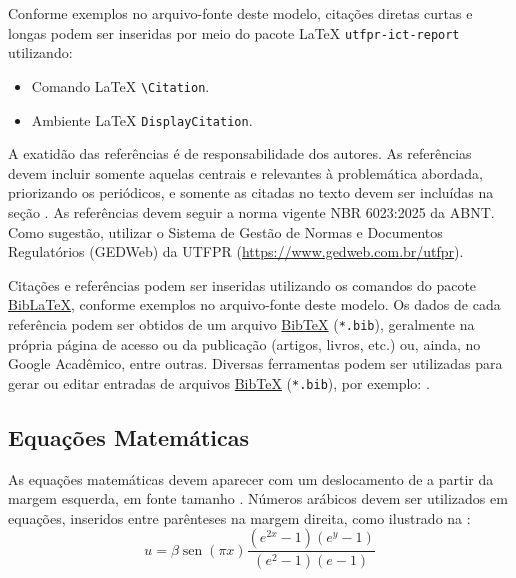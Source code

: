 \documentclass[%
  a4paper,%
  12pt,%
  fleqn,%
  english,%
  brazilian,%
]{article}
\begin{document}
\begin{OverleafFreePlan}
Conforme exemplos no arquivo-fonte deste modelo, citações diretas curtas e longas podem ser inseridas por meio do pacote \LaTeX{} \texttt{utfpr-ict-report} utilizando:

\begin{itemize}
\item Comando \LaTeX{} \texttt{{\textbackslash}Citation}.
\item Ambiente \LaTeX{} \texttt{DisplayCitation}.
\end{itemize}

A exatidão das referências é de responsabilidade dos autores.
As referências devem incluir somente aquelas centrais e relevantes à problemática abordada, priorizando os periódicos, e somente as citadas no texto devem ser incluídas na seção .
As referências devem seguir a norma vigente NBR 6023:2025 da ABNT\@.
Como sugestão, utilizar o Sistema de Gestão de Normas e Documentos Regulatórios (GEDWeb) da UTFPR (\url{https://www.gedweb.com.br/utfpr}).

Citações e referências podem ser inseridas utilizando os comandos do pacote \href{https://ctan.org/pkg/biblatex/}{Bib\LaTeX{}\LinkIcon}, conforme exemplos no arquivo-fonte deste modelo.
Os dados de cada referência podem ser obtidos de um arquivo \href{https://www.bibtex.org/}{Bib\TeX{}\LinkIcon} (\texttt{*.bib}), geralmente na própria página de acesso ou  da publicação (artigos, livros, etc.) ou, ainda, no Google Acadêmico, entre outras.
Diversas ferramentas podem ser utilizadas para gerar ou editar entradas de arquivos \href{https://www.bibtex.org/}{Bib\TeX{}\LinkIcon} (\texttt{*.bib}), por exemplo: .

\subsection{Equações Matemáticas}%
\label{ssect:eq-math}

As equações matemáticas devem aparecer com um deslocamento de  a partir da margem esquerda, em fonte tamanho .
Números arábicos devem ser utilizados em equações, inseridos entre parênteses na margem direita, como ilustrado na :
\begin{equation}%
\label{eq:u}
u = \beta \operatorname{sen} \left(\pi x\right) \frac{\left(e^{2x} - 1\right) \left(e^y - 1\right)}{\left(e^2 - 1\right) \left(e - 1\right)}
\end{equation}


\end{OverleafFreePlan}
\end{document}
